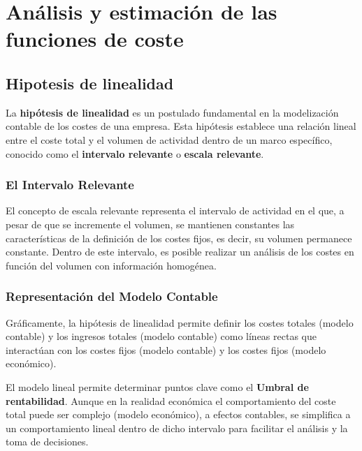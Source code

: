 
\chapter{Análisis y estimación de las funciones de coste}

\section{Hipotesis de linealidad}

La \textbf{hipótesis de linealidad} es un postulado fundamental en la modelización contable de los costes de una empresa. Esta hipótesis establece una relación lineal entre el coste total y el volumen de actividad dentro de un marco específico, conocido como el \textbf{intervalo relevante} o \textbf{escala relevante}.

\subsection{El Intervalo Relevante}

El concepto de escala relevante representa el intervalo de actividad en el que, a pesar de que se incremente el volumen, se mantienen constantes las características de la definición de los costes fijos, es decir, su volumen permanece constante. Dentro de este intervalo, es posible realizar un análisis de los costes en función del volumen con información homogénea.

\subsection{Representación del Modelo Contable}

Gráficamente, la hipótesis de linealidad permite definir los costes totales (modelo contable) y los ingresos totales (modelo contable) como líneas rectas que interactúan con los costes fijos (modelo contable) y los costes fijos (modelo económico).

\begin{tcolorbox}[title=\textbf{Implicaciones del Modelo Lineal}]
El modelo lineal permite determinar puntos clave como el \textbf{Umbral de rentabilidad}. Aunque en la realidad económica el comportamiento del coste total puede ser complejo (modelo económico), a efectos contables, se simplifica a un comportamiento lineal dentro de dicho intervalo para facilitar el análisis y la toma de decisiones.
\end{tcolorbox}

